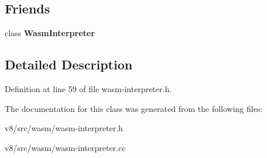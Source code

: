 \subsection*{Friends}
\begin{DoxyCompactItemize}
\item 
\mbox{\label{classv8_1_1internal_1_1wasm_1_1InterpretedFrame_a93c44270af9ecf715af3c8097d8735ff}} 
class {\bfseries Wasm\+Interpreter}
\end{DoxyCompactItemize}


\subsection{Detailed Description}


Definition at line 59 of file wasm-\/interpreter.\+h.



The documentation for this class was generated from the following files\+:\begin{DoxyCompactItemize}
\item 
v8/src/wasm/wasm-\/interpreter.\+h\item 
v8/src/wasm/wasm-\/interpreter.\+cc\end{DoxyCompactItemize}
